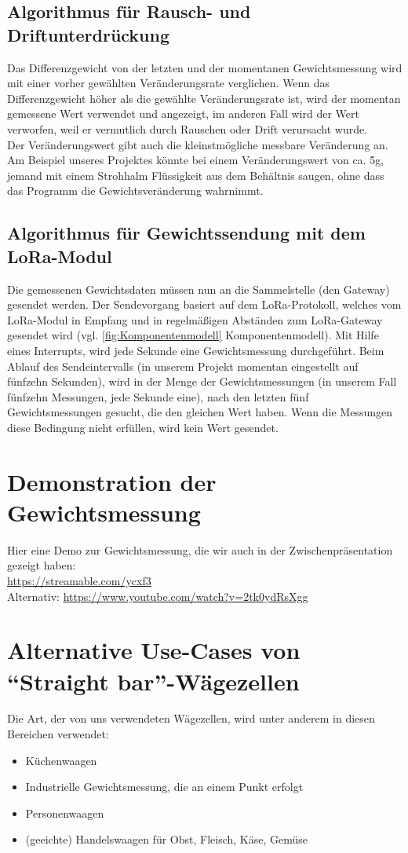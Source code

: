 \subsection{Algorithmus für Rausch- und Driftunterdrückung}
Das Differenzgewicht von der letzten und der momentanen Gewichtsmessung wird mit einer vorher gewählten Veränderungsrate verglichen. Wenn das Differenzgewicht höher als die gewählte Veränderungsrate ist, wird der momentan gemessene Wert verwendet und angezeigt, im anderen Fall wird der Wert verworfen, weil er vermutlich durch Rauschen oder Drift verursacht wurde.\\
Der Veränderungswert gibt auch die kleinstmögliche messbare Veränderung an. Am Beispiel unseres Projektes könnte bei einem Veränderungswert von ca. 5g, jemand mit einem Strohhalm Flüssigkeit aus dem Behältnis saugen, ohne dass das Programm die Gewichtsveränderung wahrnimmt.
\subsection{Algorithmus für Gewichtssendung mit dem LoRa-Modul}
Die gemessenen Gewichtsdaten müssen nun an die Sammelstelle (den Gateway) gesendet werden. Der Sendevorgang basiert auf dem LoRa-Protokoll, welches vom LoRa-Modul in Empfang und in regelmäßigen Abständen zum LoRa-Gateway gesendet wird (vgl. \ref{fig:Komponentenmodell} Komponentenmodell). Mit Hilfe eines Interrupts, wird jede Sekunde eine Gewichtsmessung durchgeführt. Beim Ablauf des Sendeintervalls (in unserem Projekt momentan eingestellt auf fünfzehn Sekunden), wird in der Menge der Gewichtsmessungen (in unserem Fall fünfzehn Messungen, jede Sekunde eine), nach den letzten fünf Gewichtsmessungen gesucht, die den gleichen Wert haben. Wenn die Messungen diese Bedingung nicht erfüllen, wird kein Wert gesendet.

\section{Demonstration der Gewichtsmessung}
Hier eine Demo zur Gewichtsmessung, die wir auch in der Zwischenpräsentation gezeigt haben:\\
\url{https://streamable.com/ycxf3}\\
Alternativ: \url{https://www.youtube.com/watch?v=2tk0ydRsXgg}

\section{Alternative Use-Cases von “Straight bar”-Wägezellen}
\label{sec:use-cases-straight-bar-waegezellen}
Die Art, der von uns verwendeten Wägezellen, wird unter anderem in diesen Bereichen verwendet:
\begin{itemize}
    \item Küchenwaagen
    \item Industrielle Gewichtsmessung, die an einem Punkt erfolgt
    \item Personenwaagen
    \item (geeichte) Handelswaagen für Obst, Fleisch, Käse, Gemüse
\end{itemize}
\newpage
